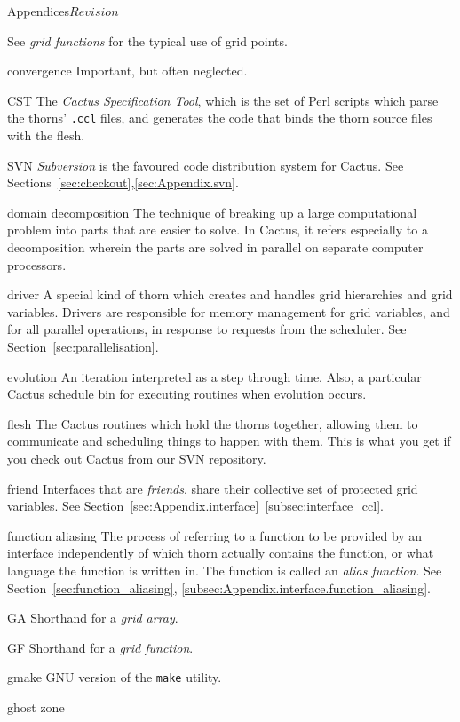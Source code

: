 \begin{cactuspart}{Appendices}{}{$Revision$}
\begin{Lentry}
  See \textit{grid functions} for the typical use of grid points.
\item[convergence]
  Important, but often neglected.
\item[CST]
  The \textit{Cactus Specification Tool}, which is the set of Perl
  scripts which parse the thorns' \texttt{.ccl} files, and generates the
  code that binds the thorn source files with the flesh.
\item[SVN]
  \textit{Subversion} is the favoured code
  distribution system for Cactus.
  See Sections~\ref{sec:checkout},\ref{sec:Appendix.svn}.
\item[domain decomposition]
  The technique of breaking up a large computational problem into parts
  that are easier to solve.  In Cactus, it refers especially to a decomposition
  wherein the parts are solved in parallel on separate computer processors.
\item[driver]
  A special kind of thorn which creates and handles grid hierarchies 
  and grid variables.
  Drivers are responsible for memory management for grid variables,
  and for all parallel operations, in response to requests from the
  scheduler.
  See Section~\ref{sec:parallelisation}.
\item[evolution]
  An iteration interpreted as a step through time.  Also, a particular Cactus
  schedule bin for executing routines when evolution occurs.
\item[flesh]
  The Cactus routines which hold the thorns together, allowing them to 
  communicate and scheduling things to happen with them. This is what you
  get if you check out Cactus from our SVN repository.
\item[friend] Interfaces that are \textit{friends}, share their collective
  set of protected grid variables.
  See Section~\ref{sec:Appendix.interface}~\ref{subsec:interface_ccl}.
\item[function aliasing]
  The process of referring to a function to be provided by an interface
  independently of which thorn actually contains the function, or what
  language the function is written in.  The function is called an
  \textit{alias function}.  See Section~\ref{sec:function_aliasing},
  \ref{subsec:Appendix.interface.function_aliasing}.
\item[GA]
  Shorthand for a \textit{grid array}.
\item[GF]
  Shorthand for a \textit{grid function}.
\item[gmake]
  GNU version of the {\tt make} utility.
\item[ghost zone] 

\end{Lentry}
\end{cactuspart}
